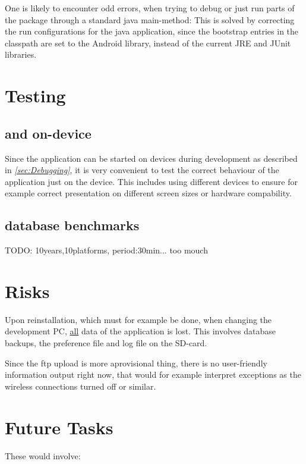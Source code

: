 \documentclass[11pt,oneside,a4paper]{scrartcl}
\begin{document}
One is likely to encounter odd errors, when trying to debug or just run parts of the package through a standard java main-method: This is solved by correcting the run configurations for the java application, since the bootstrap entries in the classpath are set to the Android library, instead of the current JRE and JUnit libraries.


\section{Testing}
\subsection{          and on-device}
Since the application can be started on devices during development as described in \textit{\ref{sec:Debugging}}, it is very convenient to test the correct behaviour of the application just on the device. This includes using different devices to ensure for example correct presentation on different screen sizes or hardware compability.

\subsection{database benchmarks}
TODO: 10years,10platforms, period:30min... too mouch

\section{Risks}
Upon reinstallation, which must for example be done, when changing the development PC, \underline{all} data of the application is lost. This involves database backups, the preference file and log file on the SD-card.

Since the ftp upload is more aprovisional thing, there is no user-friendly information output right now, that would for example interpret exceptions as the wireless connections turned off or similar.


\section{Future Tasks}
These would involve:
\end{document}
